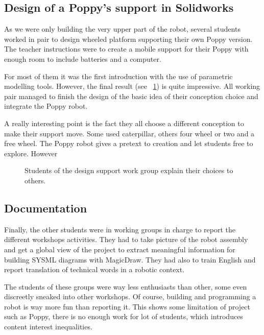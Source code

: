 \subsection{Design of a Poppy's support in Solidworks} %

As we were only building the very upper part of the robot, several students worked in pair to design wheeled platform supporting their own Poppy version. The teacher instructions were to create a mobile support for their Poppy with enough room to include batteries and a computer.

For most of them it was the first introduction with the use of parametric modelling tools. However, the final result (see \figurename~\ref{fig:saintonge_support}) is quite impressive. All working pair managed to finish the design of the basic idea of their conception choice and integrate the Poppy robot.

A really interesting point is the fact they all choose a different conception to make their support move. Some used caterpillar, others four wheel or two and a free wheel. The Poppy robot gives a pretext to creation and let students free to explore. However

\begin{figure}[]
\centering
    \hfil
    \hfil
    \caption{Students of the design support work group explain their choices to others.}
    \label{fig:saintonge_support}
\end{figure}


\subsection{Documentation } %

Finally, the other students were in working groups in charge to report the different workshops activities. They had to take picture of the robot assembly and get a global view of the project to extract meaningful information for building SYSML diagrams with MagicDraw. They had also to train English and report translation of technical words in a robotic context.

The students of these groups were way less enthusiasts than other, some even discreetly sneaked into other workshops. Of course, building and programming a robot is way more fun than reporting it. This shows some limitation of project such as Poppy, there is no enough work for lot of students, which introduces content interest inequalities.

